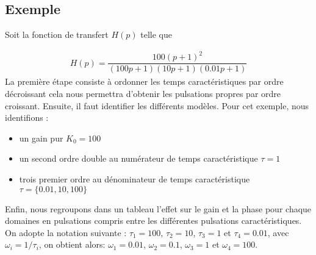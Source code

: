 \subsection*{Exemple}

Soit la fonction de transfert $H(p)$ telle que 

\begin{align}
    H(p) = \dfrac{100(p+1)^2}{(100p+1)(10p+1)(0.01p+1)}\label{eq-ft_qq}
\end{align}
La première étape consiste à ordonner les temps caractéristiques par ordre 
décroissant cela nous permettra d'obtenir les pulsations propres par ordre 
croissant. Ensuite, il faut identifier les différents modèles.
Pour cet exemple, nous identifions :
\begin{itemize}
    \item un gain pur $K_0=100$
    \item un second ordre double au numérateur de temps caractéristique 
          $\tau=1$
    \item trois premier ordre au dénominateur de temps caractéristique 
          $\tau=\{0.01,10,100\}$
\end{itemize}

Enfin, nous regroupons dans un tableau l'effet sur le gain et la phase pour 
chaque domaines en pulsations compris entre les différentes pulsations 
caractéristiques.
On adopte la notation suivante : $\tau_1=100$, $\tau_2=10$, $\tau_3=1$ 
et $\tau_4=0.01$, avec $\omega_i=1/\tau_i$, on obtient alors:
$\omega_1=0.01$, $\omega_2=0.1$, $\omega_3=1$ et $\omega_4=100$.

\begin{table}[!h]
    \centering
\end{table}



